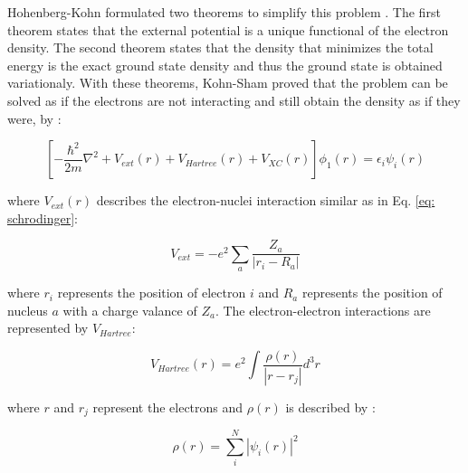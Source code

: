 Hohenberg-Kohn formulated two theorems to simplify this problem \cite{Hohenberg1964}. The first theorem states that the external potential is a unique functional of the electron density. The second theorem states that the density that minimizes the total energy is the exact ground state density and thus the ground state is obtained variationaly. With these theorems, Kohn-Sham proved that the problem can be solved as if the electrons are not interacting and still obtain the density as if they were, by \cite{Kohn1965}:
 
 \begin{equation}
 \label{eq: kohnsham}
\left[ -\frac{\hbar^2}{2m} \nabla^{2} + V_{ext} (r) + V_{Hartree}(r) + V_{XC} (r) \right] \phi_{1}(r) = \epsilon_{i} \psi_{i}(r)
 \end{equation}
 
 \noindent where $V_{ext}(r)$ describes the electron-nuclei interaction similar as in Eq. \ref{eq: schrodinger}:

\begin{equation}
\label{eq: vext}
V_{ext} = - e^2 \sum_{a} \frac {Z_{a}}{|r_i - R_a|}
\end{equation}

\noindent where $r_i$ represents the position of electron $i$ and $R_a$ represents the position of nucleus $a$ with a charge valance of $Z_a$. The electron-electron interactions are represented by $V_{Hartree}$:

\begin{equation}
\label{eq: vhartree}
V_{Hartree} (r) = e^{2} \int \frac {\rho(r)}{|r - r_{j}|} d^3r
\end{equation}

\noindent where $r$ and $r_j$ represent the electrons and $\rho (r)$ is described by :

\begin{equation}
\label{eq: rhop}
\rho (r) = \sum_{i}^N | \psi_{i} (r) |^2
\end{equation}

